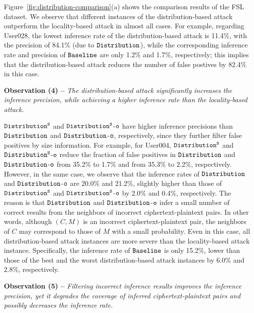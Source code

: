 Figure~\ref{fig:distribution-comparison}(a) shows the
comparison results of the FSL dataset. We observe that different instances of
the distribution-based attack outperform the locality-based attack in almost
all cases. For example, regarding User028, the lowest inference rate of the
distribution-based attack is 11.4\%, with the precision of 84.1\% (due to $\tt
Distribution$), while the corresponding inference rate and precision of
$\tt Baseline$ are only 1.2\% and 1.7\%, respectively; this implies that the distribution-based attack reduces the number of false postives by 82.4\% in this case.   

{\bf Observation (4) --} {\em The distribution-based attack significantly
increases the inference precision, while achieving a higher inference rate than
the locality-based attack.} 

$\tt Distribution^S$ and $\tt Distribution^S$-$\tt o$ have higher inference
precisions than $\tt Distribution$ and $\tt Distribution$-$\tt o$,
respectively, since they further filter false positives by size information.
For example, for User004, $\tt Distribution^S$ and $\tt Distribution^S$-$\tt o$  reduce the fraction of false positives in  $\tt Distribution$ and $\tt Distribution$-$\tt o$ from 35.2\% to 1.7\% and from 35.3\% to 2.2\%, respectively. However, in the same case,    
 we observe that the inference rates of $\tt Distribution$ and $\tt Distribution$-$\tt o$ are 20.0\% and 21.2\%, slightly higher than those of  
$\tt Distribution^S$ and
$\tt Distribution^S$-$\tt o$ by 2.0\% and
0.4\%, respectively. The reason is that $\tt Distribution$ and $\tt
Distribution$-$\tt o$ infer a small number of correct results from the
neighbors of incorrect ciphertext-plaintext pairs. In other words,  although
$(C, M)$ is an incorrect ciphertext-plaintext pair, the neighbors of $C$ may
correspond to those of $M$ with a small probability. Even in this case, all distribution-based attack instances are more severe than the locality-based attack instance. Specifically, the inference rate of $\tt Baseline$ is only 15.2\%, lower than those of the best and the worst distribution-based attack instances by 6.0\% and 2.8\%, respectively. 


{\bf Observation (5) --} {\em Filtering incorrect inference results improves
the inference precision, yet it degrades the coverage of inferred
ciphertext-plaintext pairs and possibly decreases the inference rate.
} 

